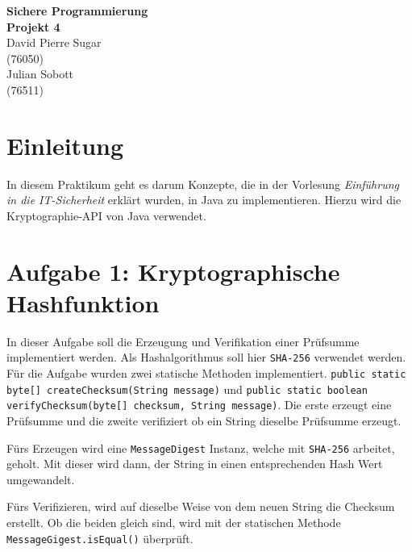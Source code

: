 \documentclass[12pt]{article}
\begin{document}
\begin{center}
  \textbf{\LARGE Sichere Programmierung} \\[1ex]%
  \textbf{\Large Projekt 4}\\[2ex] %
  David Pierre Sugar\\ %
  (76050) \\ %
  Julian Sobott\\ %
  (76511) \\ %
  
\end{center}

\tableofcontents

\section{Einleitung}
In diesem Praktikum geht es darum Konzepte, die in der Vorlesung \textit{Einführung in die IT-Sicherheit} erklärt wurden, in Java zu implementieren. Hierzu wird die Kryptographie-API von Java verwendet.

\section{Aufgabe 1: Kryptographische Hashfunktion}

In dieser Aufgabe soll die Erzeugung und Verifikation einer Prüfsumme implementiert werden. Als Hashalgorithmus soll hier \texttt{SHA-256} verwendet werden.
Für die Aufgabe wurden zwei statische Methoden implementiert. \texttt{public static byte[] createChecksum(String message)} und \texttt{public static boolean verifyChecksum(byte[] checksum, String message)}. Die erste erzeugt eine Prüfsumme und die zweite verifiziert ob ein String dieselbe Prüfsumme erzeugt.

Fürs Erzeugen wird eine \texttt{MessageDigest} Instanz, welche mit \texttt{SHA-256} arbeitet, geholt. Mit dieser wird dann, der String in einen entsprechenden Hash Wert umgewandelt.

Fürs Verifizieren, wird auf dieselbe Weise von dem neuen String die Checksum erstellt. Ob die beiden gleich sind, wird mit der statischen Methode \texttt{MessageGigest.isEqual()} überprüft.
\end{document}
